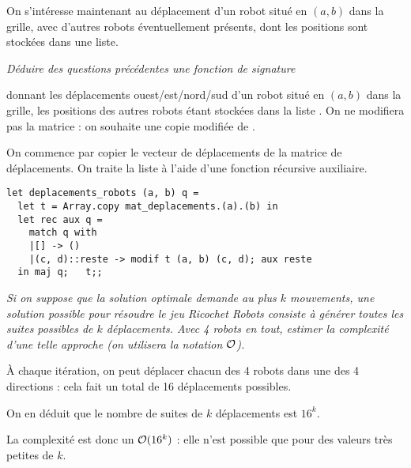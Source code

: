 On s’intéresse maintenant au déplacement d’un robot situé en
$(a,b)$ dans la grille, avec d’autres robots éventuellement présents,
dont les positions sont stockées dans une liste.
\begin{Exercise}\it
Déduire des questions précédentes une fonction
 de signature


donnant les
déplacements ouest/est/nord/sud d’un robot situé en $(a,b)$ dans la
grille, les positions des autres robots étant stockées dans la liste
. On ne modifiera pas la matrice  : on
souhaite une copie modifiée de .
\end{Exercise}
\begin{Answer}
On commence par copier le vecteur de déplacements de la matrice de déplacements. On traite la liste à l'aide d'une fonction récursive auxiliaire.
\begin{lstlisting}
let deplacements_robots (a, b) q =
  let t = Array.copy mat_deplacements.(a).(b) in
  let rec aux q = 
    match q with
    |[] -> ()
    |(c, d)::reste -> modif t (a, b) (c, d); aux reste 
  in maj q;   t;;
\end{lstlisting}
\end{Answer}
\begin{Exercise}\it
Si on suppose que la solution optimale demande au plus $k$ mouvements,
une solution possible pour résoudre le jeu Ricochet Robots consiste à
générer toutes les suites possibles de $k$ déplacements.
Avec 4 robots en tout, estimer la complexité d’une telle approche (on
utilisera la notation ${\cal O}$).
\end{Exercise}
\begin{Answer}
À chaque itération, on peut déplacer chacun des 4 robots dans une des 4 directions : cela fait un total de 16 déplacements possibles. 

On en déduit que le nombre de suites de $k$ déplacements est $16^k$.

La complexité est donc un ${\cal O}(16^k)$ : elle n'est possible que pour des valeurs très petites de $k$.
\end{Answer}

